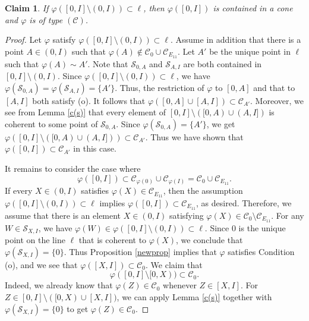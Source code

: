 \documentclass[10pt]{amsart}
\newtheorem{claim}[theorem]{Claim}
\theoremstyle{definition}
\theoremstyle{remark}
\numberwithin{subsection}{section}
\numberwithin{equation}{section}
\newcommand\cC{{\mathcal{C}}}
\begin{document}
\begin{claim}
If $\varphi([0, I]\setminus(0,I))\subset \ell$, then $\varphi([0, I])$ is contained in a cone and $\varphi$ is of type $(\mathcal{C})$.
\end{claim}
\begin{proof}
Let $\varphi$ satisfy $\varphi([0, I]\setminus(0,I))\subset \ell$.
Assume in addition that there is a point $A\in (0, I)$ such that  $\varphi(A)\notin\mathcal{C}_0\cup \mathcal{C}_{E_{11}}$. 
Let $A'$ be the unique point in $\ell$ such that $\varphi(A)\sim A'$.
Note that $\mathcal{S}_{0, A}$ and $\mathcal{S}_{A, I}$ are both contained in $[0,I]\setminus(0,I)$.
Since $\varphi([0, I]\setminus (0, I))\subset  \ell$, we have $\varphi(\mathcal{S}_{0, A})=\varphi(\mathcal{S}_{A, I}) = \{A'\}$. 
Thus, the restriction of $\varphi$ to $[0, A]$ and that to $[A, I]$ both satisfy (o). 
It follows that $\varphi([0,A]\cup [A, I])\subset \cC_{A'}$.
Moreover, we see from Lemma \ref{c(s)} that every element of $[0,I]\setminus([0, A)\cup (A, I])$ is coherent to some point of ${\mathcal{S}}_{0, A}$.
Since $\varphi({\mathcal{S}}_{0, A})=\{A'\}$, we get $\varphi([0,I]\setminus([0, A)\cup (A, I]))\subset\cC_{A'}$. 
Thus we have shown that $\varphi([0,I])\subset \cC_{A'}$ in this case.

It remains to consider the case where
\[
\varphi([0, I])\subset\mathcal{C}_{\varphi(0)}\cup \mathcal{C}_{\varphi(I)}=\mathcal{C}_0 \cup \mathcal{C}_{E_{11}}.
\] 
If every $X\in (0, I)$ satisfies $\varphi(X)\in \mathcal{C}_{E_{11}}$, then the assumption $\varphi([0, I]\setminus (0, I))\subset \ell$ implies $\varphi([0, I])\subset \cC_{E_{11}}$, as desired. 
Therefore, we assume that there is an element $X\in (0, I)$ satisfying $\varphi(X)\in \mathcal{C}_0\setminus \mathcal{C}_{E_{11}}$.
For any $W \in \mathcal{S}_{X,I}$, we have $\varphi (W) \in \varphi([0, I]\setminus (0, I))\subset \ell$. 
Since $0$ is the unique point on the line $\ell$ that is coherent to $\varphi(X)$, we conclude that
$\varphi(\mathcal{S}_{X, I}) =\{0\}$. 
Thus Proposition \ref{newprop} implies that $\varphi$ satisfies Condition (o), and we see that $\varphi ([X,I]) \subset  \mathcal{C}_0$.
We claim that 
\begin{equation}\label{metka}
\varphi([0, I]\setminus [0, X))\subset \mathcal{C}_0.
\end{equation}
Indeed, we already know that $\varphi (Z) \in  \mathcal{C}_0$ whenever $Z \in [X,I]$. For $Z \in [0, I]\setminus ([0, X) \cup [X,I])$, we can apply Lemma \ref{c(s)} together with $\varphi(\mathcal{S}_{X, I}) =\{0\}$ to get  $\varphi (Z) \in  \mathcal{C}_0$.


\end{proof}
\end{document}
